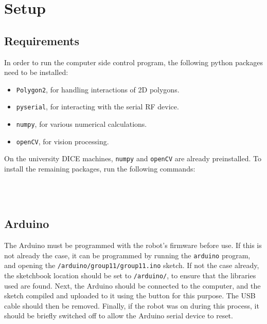 \section{Setup}
\subsection{Requirements}

In order to run the computer side control program, the following python
packages need to be installed:

\begin{itemize}
\item \texttt{Polygon2}, for handling interactions of 2D polygons.
\item \texttt{pyserial}, for interacting with the serial RF device.
\item \texttt{numpy}, for various numerical calculations.
\item \texttt{openCV}, for vision processing.
\end{itemize}

On the university DICE machines, \texttt{numpy} and \texttt{openCV} are already
preinstalled. To install the remaining packages, run the following commands:

 \\
 \\

\subsection{Arduino}

The Arduino must be programmed with the robot's firmware before use. If this is
not already the case, it can be programmed by running the \texttt{arduino}
program, and opening the \texttt{/arduino/group11/group11.ino} sketch. If not
the case already, the sketchbook location should be set to \texttt{/arduino/},
to ensure that the libraries used are found. Next, the Arduino should be
connected to the computer, and the sketch compiled and uploaded to it using the
button for this purpose. The USB cable should then be removed. Finally, if the
robot was on during this process, it should be briefly switched off to allow
the Arduino serial device to reset.
